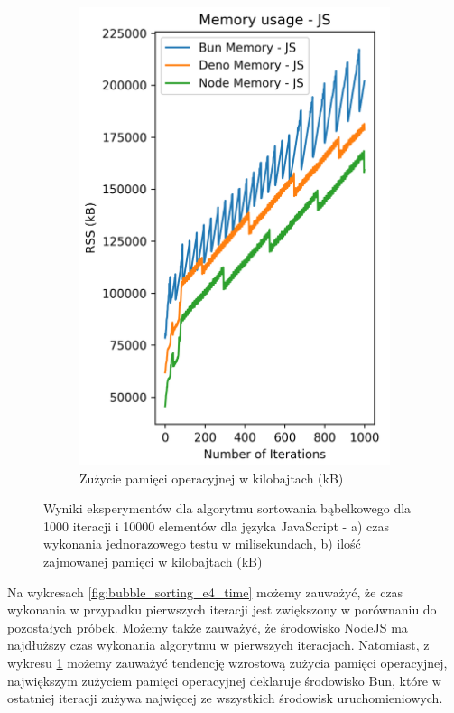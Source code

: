 \begin{figure}[H]
\begin{subfigure}[b]{0.44\textwidth}
  \end{subfigure}
  \begin{subfigure}[b]{0.44\textwidth}
    \centering
    \includegraphics[width=\textwidth]{Figures/sorting/sorting_bubble_1000_10000_js_memory.png}
    \caption{Zużycie pamięci operacyjnej w kilobajtach (kB)}
    \label{fig:bubble_sorting_e4_memory}
  \end{subfigure}
  \caption{Wyniki eksperymentów dla algorytmu sortowania bąbelkowego dla 1000 iteracji i 10000 elementów dla języka JavaScript - a) czas wykonania jednorazowego testu w milisekundach, b) ilość zajmowanej pamięci w kilobajtach (kB)}
  \label{fig:bubble_sorting_e4}
\end{figure}

Na wykresach \ref{fig:bubble_sorting_e4_time} możemy zauważyć, że czas wykonania w przypadku pierwszych iteracji jest zwiększony w porównaniu do pozostałych próbek. Możemy także zauważyć, że środowisko NodeJS ma najdłuższy czas wykonania algorytmu w pierwszych iteracjach. Natomiast, z wykresu \ref{fig:bubble_sorting_e4_memory} możemy zauważyć tendencję wzrostową zużycia pamięci operacyjnej, największym zużyciem pamięci operacyjnej deklaruje środowisko Bun, które w ostatniej iteracji zużywa najwięcej ze wszystkich środowisk uruchomieniowych.


